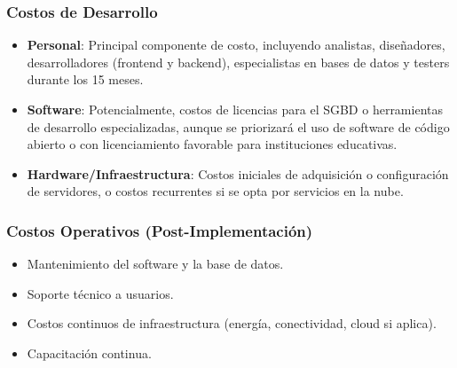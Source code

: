 \subsubsection{Costos de Desarrollo}
\begin{itemize}
    \item \textbf{Personal}: Principal componente de costo, incluyendo analistas, diseñadores, desarrolladores (frontend y backend), especialistas en bases de datos y testers durante los 15 meses.
\item \textbf{Software}: Potencialmente, costos de licencias para el SGBD o herramientas de desarrollo especializadas, aunque se priorizará el uso de software de código abierto o con licenciamiento favorable para instituciones educativas.
\item \textbf{Hardware/Infraestructura}: Costos iniciales de adquisición o configuración de servidores, o costos recurrentes si se opta por servicios en la nube.
\end{itemize}
\subsubsection{Costos Operativos (Post-Implementación)}
\begin{itemize}
    \item Mantenimiento del software y la base de datos.
\item Soporte técnico a usuarios.
\item Costos continuos de infraestructura (energía, conectividad, cloud si aplica).
\item Capacitación continua.
\end{itemize}
